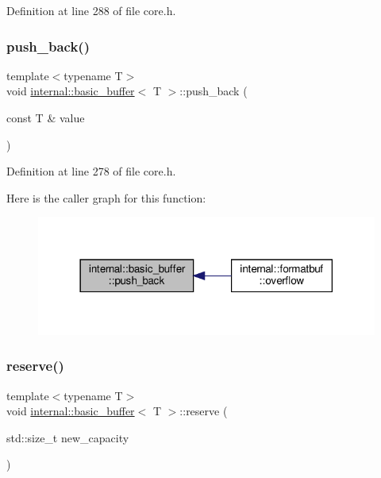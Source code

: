 Definition at line 288 of file core.\+h.

\mbox{\label{classinternal_1_1basic__buffer_a8dd9de72728ab902c31f22bdba9a7a55}} 
\subsubsection{\texorpdfstring{push\+\_\+back()}{push\_back()}}
{\footnotesize\ttfamily template$<$typename T$>$ \\
void \hyperlink{classinternal_1_1basic__buffer}{internal\+::basic\+\_\+buffer}$<$ T $>$\+::push\+\_\+back (\begin{DoxyParamCaption}\item[{const T \&}]{value }\end{DoxyParamCaption})\hspace{0.3cm}{\ttfamily [inline]}}



Definition at line 278 of file core.\+h.

Here is the caller graph for this function\+:
\nopagebreak
\begin{figure}[H]
\begin{center}
\leavevmode
\includegraphics[width=318pt]{classinternal_1_1basic__buffer_a8dd9de72728ab902c31f22bdba9a7a55_icgraph}
\end{center}
\end{figure}
\mbox{\label{classinternal_1_1basic__buffer_ab4bbc728c01282567eebc165d545772a}} 
\subsubsection{\texorpdfstring{reserve()}{reserve()}}
{\footnotesize\ttfamily template$<$typename T$>$ \\
void \hyperlink{classinternal_1_1basic__buffer}{internal\+::basic\+\_\+buffer}$<$ T $>$\+::reserve (\begin{DoxyParamCaption}\item[{std\+::size\+\_\+t}]{new\+\_\+capacity }\end{DoxyParamCaption})\hspace{0.3cm}{\ttfamily [inline]}}


